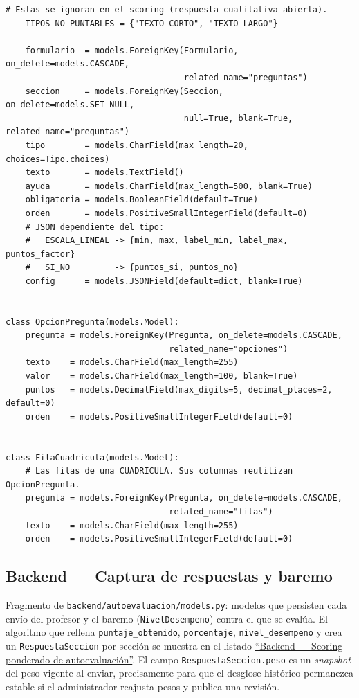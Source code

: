 \begin{Verbatim}[fontsize=\small, frame=single]
    # Estas se ignoran en el scoring (respuesta cualitativa abierta).
    TIPOS_NO_PUNTABLES = {"TEXTO_CORTO", "TEXTO_LARGO"}

    formulario  = models.ForeignKey(Formulario, on_delete=models.CASCADE,
                                    related_name="preguntas")
    seccion     = models.ForeignKey(Seccion, on_delete=models.SET_NULL,
                                    null=True, blank=True, related_name="preguntas")
    tipo        = models.CharField(max_length=20, choices=Tipo.choices)
    texto       = models.TextField()
    ayuda       = models.CharField(max_length=500, blank=True)
    obligatoria = models.BooleanField(default=True)
    orden       = models.PositiveSmallIntegerField(default=0)
    # JSON dependiente del tipo:
    #   ESCALA_LINEAL -> {min, max, label_min, label_max, puntos_factor}
    #   SI_NO         -> {puntos_si, puntos_no}
    config      = models.JSONField(default=dict, blank=True)


class OpcionPregunta(models.Model):
    pregunta = models.ForeignKey(Pregunta, on_delete=models.CASCADE,
                                 related_name="opciones")
    texto    = models.CharField(max_length=255)
    valor    = models.CharField(max_length=100, blank=True)
    puntos   = models.DecimalField(max_digits=5, decimal_places=2, default=0)
    orden    = models.PositiveSmallIntegerField(default=0)


class FilaCuadricula(models.Model):
    # Las filas de una CUADRICULA. Sus columnas reutilizan OpcionPregunta.
    pregunta = models.ForeignKey(Pregunta, on_delete=models.CASCADE,
                                 related_name="filas")
    texto    = models.CharField(max_length=255)
    orden    = models.PositiveSmallIntegerField(default=0)
\end{Verbatim}

\subsection{Backend --- Captura de respuestas y baremo}\label{lst:modelos_respuesta}

Fragmento de \texttt{backend/autoevaluacion/models.py}: modelos que persisten cada envío del profesor y el baremo (\texttt{NivelDesempeno}) contra el que se evalúa. El algoritmo que rellena \texttt{puntaje\_obtenido}, \texttt{porcentaje}, \texttt{nivel\_desempeno} y crea un \texttt{RespuestaSeccion} por sección se muestra en el listado \hyperref[lst:scoring]{``Backend --- Scoring ponderado de autoevaluación''}. El campo \texttt{RespuestaSeccion.peso} es un \emph{snapshot} del peso vigente al enviar, precisamente para que el desglose histórico permanezca estable si el administrador reajusta pesos y publica una revisión.

